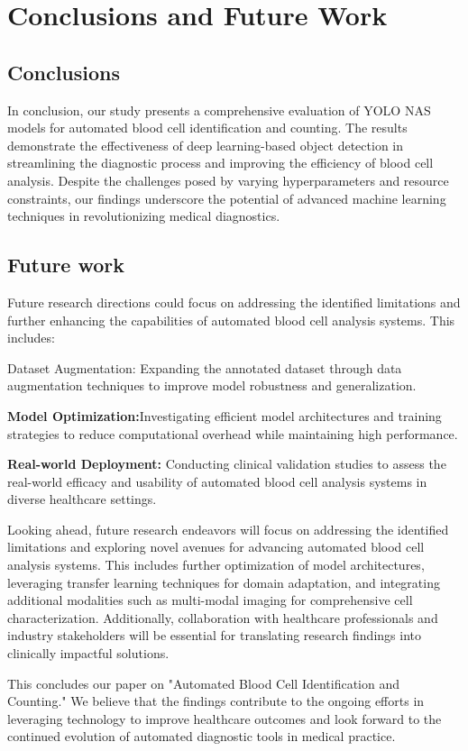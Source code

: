 \chapter{Conclusions and Future Work}
\label{ch:con}
\section{Conclusions}
In conclusion, our study presents a comprehensive evaluation of YOLO NAS models for automated blood cell identification and counting. The results demonstrate the effectiveness of deep learning-based object detection in streamlining the diagnostic process and improving the efficiency of blood cell analysis. Despite the challenges posed by varying hyperparameters and resource constraints, our findings underscore the potential of advanced machine learning techniques in revolutionizing medical diagnostics. 

\section{Future work}
Future research directions could focus on addressing the identified limitations and further enhancing the capabilities of automated blood cell analysis systems. This includes:



Dataset Augmentation: Expanding the annotated dataset through data augmentation techniques to improve model robustness and generalization.

\textbf{Model Optimization:}Investigating efficient model architectures and training strategies to reduce computational overhead while maintaining high performance.

\textbf{Real-world Deployment:} Conducting clinical validation studies to assess the real-world efficacy and usability of automated blood cell analysis systems in diverse healthcare settings.



Looking ahead, future research endeavors will focus on addressing the identified limitations and exploring novel avenues for advancing automated blood cell analysis systems. This includes further optimization of model architectures, leveraging transfer learning techniques for domain adaptation, and integrating additional modalities such as multi-modal imaging for comprehensive cell characterization. Additionally, collaboration with healthcare professionals and industry stakeholders will be essential for translating research findings into clinically impactful solutions.



This concludes our paper on "Automated Blood Cell Identification and Counting." We believe that the findings contribute to the ongoing efforts in leveraging technology to improve healthcare outcomes and look forward to the continued evolution of automated diagnostic tools in medical practice.


